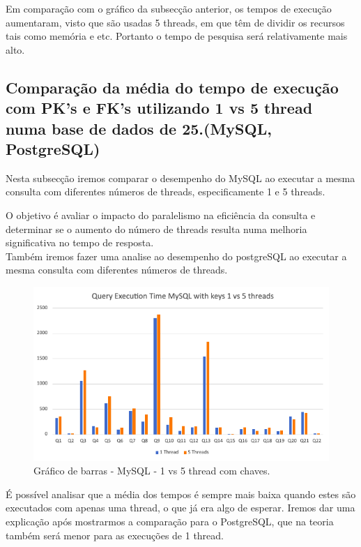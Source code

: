 \documentclass{article}
\begin{document}
\quad Em comparação com o gráfico da subsecção anterior, os tempos de execução aumentaram, visto que são usadas 5 threads, em que têm de dividir os recursos tais como memória e etc. Portanto o tempo de pesquisa será relativamente mais alto.
\clearpage
  \subsection{Comparação da média do tempo de execução com PK's e FK's
  utilizando 1 vs 5 thread numa base de dados de 25.(MySQL, PostgreSQL)}
  
  \quad Nesta subsecção iremos comparar o desempenho do MySQL ao executar a mesma consulta com diferentes números de threads, especificamente 1 e 5 threads. 
  
  O objetivo é avaliar o impacto do paralelismo na eficiência da consulta e determinar se o aumento do número de threads resulta numa melhoria significativa no tempo de resposta.\\
  
  Também iremos fazer uma analise ao desempenho do postgreSQL ao executar a mesma consulta com diferentes números de threads.

  \begin{figure}[H]
    \centering
    \includegraphics[width=\textwidth]{Graphs/mysql_withkeys_1vs5threads.png}
    \caption{Gráfico de barras - MySQL - 1 vs 5 thread com chaves.} 
    \label{fig:PKCreation2}

  \end{figure}

  \quad É possível analisar que a média dos tempos é sempre mais baixa quando estes são executados com apenas uma thread, o que já era algo de esperar. Iremos dar uma explicação após mostrarmos a comparação para o PostgreSQL, que na teoria também será menor para as execuções de 1 thread.
\end{document}

